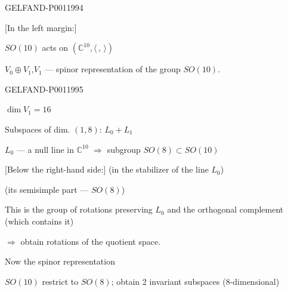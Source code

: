 \begin{GelfandAdjacentEvidence}{GELFAND-P001199}{4}


[In the left margin:] 

$SO(10)$ acts on $(\mathbb C^{10},\langle\, ,\,\rangle)$

$V_0\oplus V_1$,\quad $V_1$ --- spinor representation of the group $SO(10)$.
\end{GelfandAdjacentEvidence}
\begin{GelfandAdjacentEvidence}{GELFAND-P001199}{5}


$\dim V_1=16$

Subspaces of dim. $(1,8)$: $L_0+L_1$

$L_0$ --- a null line in $\mathbb C^{10}$ $\Longrightarrow$
subgroup $SO(8)\subset SO(10)$

[Below the right-hand side:]
(in the stabilizer of the line $L_0$)

(its semisimple part --- $SO(8)$)

This is the group of rotations preserving $L_0$ and the orthogonal complement (which contains it)

$\Longrightarrow$ obtain rotations of the quotient space.

Now the spinor representation
\end{GelfandAdjacentEvidence}

$SO(10)$ restrict to $SO(8)$; obtain 2 invariant subspaces (8-dimensional)


